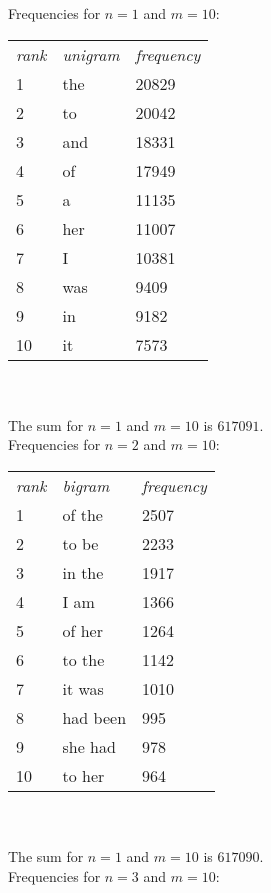 \documentclass[a4paper, 10pt]{article}
\begin{document}
Frequencies for $n = 1$ and $m = 10$:\\
\begin{tabular}{l l l}
\textit{rank}&	\textit{unigram}	& \textit{frequency} \\
1	&	the		& 20829 \\
2	&	to		& 20042 \\
3	&	and		& 18331\\
4	&	of		& 17949\\
5	&	a		& 11135\\
6	&	her		& 11007\\
7	&	I		& 10381\\
8	&	was		& 9409\\
9	&	in		& 9182\\
10	&	it		& 7573\\
\end{tabular}\\
\\
The sum for $n = 1$ and $m = 10$ is $617091$.\\

Frequencies for $n = 2$ and $m = 10$:\\

\begin{tabular}{l l l}
\textit{rank}&	\textit{bigram}	& \textit{frequency} \\
1	&	of the		&  2507	\\
2	&	to be		&  2233	\\ 
3	&	in the		&  1917	\\ 
4	&	I am		&  1366	\\ 
5	&	of her		&  1264	\\ 
6	&	to the		&  1142	\\ 
7	&	it was		&  1010	\\ 
8	&	had been	&  995	\\ 
9	&	she had		&  978	\\ 
10	&	to her		&  964	\\ 
\end{tabular}\\
\\
The sum for $n = 1$ and $m = 10$ is $617090$.\\

Frequencies for $n = 3$ and $m = 10$:\\
\end{document}
